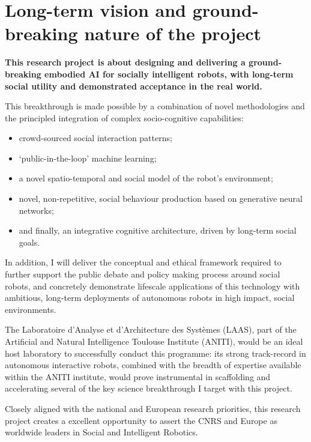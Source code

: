 

\section{Long-term vision and ground-breaking nature of the project}

\begin{framed}

\noindent\bf This research project is about designing and
delivering a ground-breaking embodied AI for socially intelligent robots, with
long-term social utility and demonstrated acceptance in the real world.

\vspace{0.4em}
\noindent This breakthrough is made possible by a combination of novel methodologies and
the principled integration of complex socio-cognitive capabilities:

\begin{itemize}
        \item crowd-sourced social interaction patterns;
        \item `public-in-the-loop' machine learning;
        \item a novel spatio-temporal and social model of the robot's environment;
        \item novel, non-repetitive, social behaviour production based on
            generative neural networks;
        \item and finally, an integrative cognitive architecture, driven by
            long-term social goals.
\end{itemize}


\vspace{0.4em}
\noindent In addition, I will deliver the conceptual and ethical framework
required to further support the public debate and policy making process
around social robots, and concretely demonstrate lifescale applications of
this technology with ambitious, long-term deployments of autonomous robots
in high impact, social environments.


\vspace{0.4em}
\noindent The Laboratoire d'Analyse et d'Architecture des Systèmes (LAAS), part
of the Artificial and Natural Intelligence Toulouse Institute (ANITI), would
be an ideal host laboratory to successfully conduct this programme: its
strong track-record in autonomous interactive robots, combined with the breadth
of expertise available within the ANITI institute, would prove instrumental in
scaffolding and accelerating several of the key science breakthrough I target
with this project.

\vspace{0.4em}
\noindent Closely aligned with the national and European research priorities,
this research project creates a excellent opportunity to assert the CNRS and
Europe as worldwide leaders in Social and Intelligent Robotics.

\end{framed}

